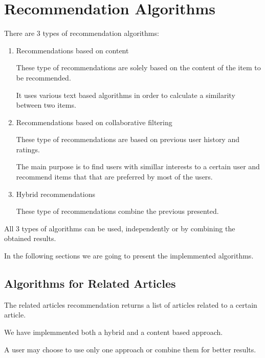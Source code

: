 \chapter{Recommendation Algorithms}
\label{chapter:recommendation-system-algorithms}
There are 3 types of recommendation algorithms: 
\begin{enumerate}
	\item Recommendations based on content
		 
		These type of recommendations are solely based on the content of the item to be recommended.
		
		It uses various text based algorithms in order to calculate a similarity between two items.

	\item Recommendations based on collaborative filtering 
		
		These type of recommendations are based on previous user history and ratings.
		 
		The main purpose is to find users with simillar interests to a certain user and recommend items that that are preferred by most of the users.
	
	\item Hybrid recommendations

		These type of recommendations combine the previous presented.

\end{enumerate}
All 3 types of algorithms can be used, independently or by combining the obtained results.

In the following sections we are going to present the implemmented algorithms.


\section{Algorithms for Related Articles}
\label{sec:algorithms-for-related-articles}
The related articles recommendation returns a list of articles related to a certain article.

We have implemmented both a hybrid and a content based approach.

A user may choose to use only one approach or combine them for better results.

